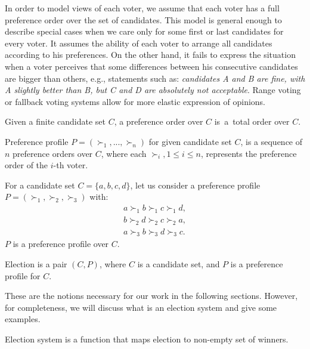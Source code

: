 In order to model views of each voter,
we assume that each voter has a full preference order over the set of candidates.
This model is general enough to describe special cases
when we care only for some first or last candidates for every voter.
It assumes the ability of each voter to arrange all candidates according to his preferences.
On the other hand, it fails to express the situation when a voter perceives that some differences
between his consecutive candidates are bigger than others, e.g., statements such as:
\textit{candidates A and B are fine, with A slightly better than B, but C and D are absolutely not acceptable}.
Range voting \cite{rangevoting} or fallback voting \cite{fallbackvoting} systems
allow for more elastic expression of opinions.

\begin{defn}
Given a finite candidate set $C$, a preference order over $C$
is~a~total order over $C$.
\end{defn}

\begin{defn}
Preference profile $P = (\succ_1, ... , \succ_n)$ for given candidate set $C$,
is a sequence of $n$ preference orders over $C$,
where each $\succ_i, 1 \leq i \leq n$, represents the preference order of the $i$-th voter.
\end{defn}

\begin{exmp} \label{example-election}
For a candidate set $C = \{a, b, c, d\}$,
let us consider a preference profile $P = (\succ_1, \succ_2, \succ_3)$ with:
\begin{align*}
a \succ_1 b \succ_1 c \succ_1 d, \\
b \succ_2 d \succ_2 c \succ_2 a,	\\
a \succ_3 b \succ_3 d \succ_3 c.
\end{align*}
$P$ is a preference profile over $C$.
\end{exmp}


\begin{defn}[election]
Election is a pair $(C, P)$, where $C$ is a candidate set, and $P$ is a preference profile for $C$.
\end{defn}

These are the notions necessary for our work in the following sections.
However, for completeness, we will discuss what is an election system and give some examples.

\begin{defn}
Election system is a function that maps election to non-empty set of winners.
\end{defn}

